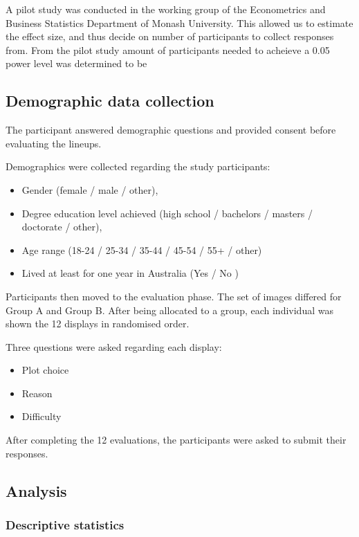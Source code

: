 \documentclass[conference,final,]{IEEEtran}
\providecommand{\tightlist}{%
  \setlength{\itemsep}{0pt}\setlength{\parskip}{0pt}}
\begin{document}
A pilot study was conducted in the working group of the Econometrics and Business Statistics Department of Monash University. This allowed us to estimate the effect size, and thus decide on number of participants to collect responses from. From the pilot study amount of participants needed to acheieve a 0.05 power level was determined to be

\hypertarget{demographic-data-collection}{%
\subsection{Demographic data collection}\label{demographic-data-collection}}

The participant answered demographic questions and provided consent before evaluating the lineups.

Demographics were collected regarding the study participants:

\begin{itemize}
\tightlist
\item
  Gender (female / male / other),
\item
  Degree education level achieved (high school / bachelors / masters / doctorate / other),
\item
  Age range (18-24 / 25-34 / 35-44 / 45-54 / 55+ / other)
\item
  Lived at least for one year in Australia (Yes / No )
\end{itemize}

Participants then moved to the evaluation phase.
The set of images differed for Group A and Group B.
After being allocated to a group, each individual was shown the 12 displays in randomised order.

Three questions were asked regarding each display:

\begin{itemize}
\tightlist
\item
  Plot choice
\item
  Reason
\item
  Difficulty
\end{itemize}

After completing the 12 evaluations, the participants were asked to submit their responses.

\hypertarget{analysis}{%
\subsection{Analysis}\label{analysis}}

\hypertarget{descriptive-statistics}{%
\subsubsection{Descriptive statistics}\label{descriptive-statistics}}
\end{document}
